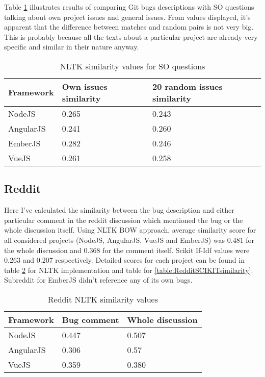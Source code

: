 Table \ref{table:StackOverflowNLTKsimilarity} illustrates results of comparing Git bugs descriptions with SO questions talking about own project issues and general issues. From values displayed, it's apparent that the difference between matches and random pairs is not very big. This is probably because all the texts about a particular project are already very specific and similar in their nature anyway.

\begin{table}[H]
\centering
\begin{tabular}{ |p{3cm}||p{4.5cm}|p{5.5cm}|}
 \hline
\textbf{ Framework }& \textbf{Own issues similarity}& \textbf{20 random issues similarity}\\
 \hline
 NodeJS   & 0.265 & 0.243\\ \hline
 AngularJS & 0.241 & 0.260\\ \hline
 EmberJS & 0.282 & 0.246\\ \hline 
 VueJS &   0.261 & 0.258\\ \hline
\end{tabular}
\caption{NLTK similarity values for SO questions}
\label{table:StackOverflowNLTKsimilarity}
\end{table}

\subsection{Reddit}Here I've calculated the similarity between the bug description and either particular comment in the reddit discussion which mentioned the bug or the whole discussion itself. Using NLTK BOW approach, average similarity score for all considered projects (NodeJS, AngularJS, VueJS and EmberJS) was 0.481 for the whole discussion and 0.368 for the comment itself. Scikit If-Idf values were 0.263 and 0.207 respectively. Detailed scores for each project can be found in table \ref{table:RedditNLTKsimilarity} for NLTK implementation and  table for \ref{table:RedditSCIKITsimilarity}. Subreddit for EmberJS didn't reference any of its own bugs.

\begin{table}[H]
\centering
\begin{tabular}{ |p{3cm}||p{3cm}|p{4cm}|}
 \hline
\textbf{ Framework }& \textbf{Bug comment}& \textbf{Whole discussion}\\
 \hline
 NodeJS   & 0.447 & 0.507\\ \hline 
 AngularJS & 0.306 & 0.57 \\ \hline 
 VueJS &   0.359 & 0.380\\ \hline
\end{tabular}
\caption{Reddit NLTK similarity values}
\label{table:RedditNLTKsimilarity}
\end{table}

